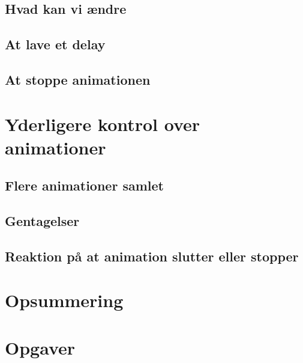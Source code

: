 \subsection{Hvad kan vi ændre}
\subsection{At lave et delay}
\subsection{At stoppe animationen}
\section{Yderligere kontrol over animationer}
\subsection{Flere animationer samlet}
\subsection{Gentagelser}
\subsection{Reaktion på at animation slutter eller stopper}
\section{Opsummering}
\section{Opgaver}